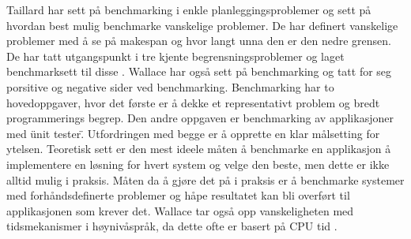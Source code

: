 Taillard har sett på benchmarking i enkle planleggingsproblemer og sett på hvordan best mulig benchmarke vanskelige problemer. De har definert vanskelige problemer med å se på makespan og hvor langt unna den er den nedre grensen. De har tatt utgangspunkt i tre kjente begrensningsproblemer og laget benchmarksett til disse \cite{Taillard1993278}. Wallace har også sett på benchmarking og tatt for seg porsitive og negative sider ved benchmarking. Benchmarking har to hovedoppgaver, hvor det første er å dekke et representativt problem og bredt programmerings begrep. Den andre oppgaven er benchmarking av applikasjoner med \"unit tester\". Utfordringen med begge er å opprette en klar målsetting for ytelsen. Teoretisk sett er den mest ideele måten å benchmarke en applikasjon å implementere en løsning for hvert system og velge den beste, men dette er ikke alltid mulig i praksis. Måten da å gjøre det på i praksis er å benchmarke systemer med forhåndsdefinerte problemer og håpe resultatet kan bli overført til applikasjonen som krever det. Wallace tar også opp vanskeligheten med tidsmekanismer i høynivåspråk, da dette ofte er basert på CPU tid \cite{Wallace:2004:BCL:956860.956861}.
\begin{comment}
\begin{itemize}
\item (Laborie) IBM ILOG CP Optimizer for Detailed Scheduling Illustrated in Three problems \cite{Laborie:2009:IIC:1560579.1560593}
\begin{itemize}
\item ...
\end{itemize}

\item (Biskup) Enslig-maskin planlegging med læringsbetraktninger %
\begin{itemize}
\item \dots
\end{itemize}

\end{itemize}
\end{comment}